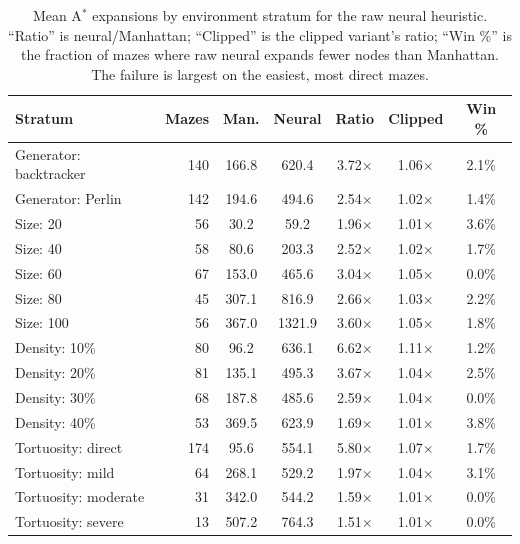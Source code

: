 \begin{table}[H]
\centering
\small
\begin{tabular}{lrccccc}
\toprule
\textbf{Stratum} & \textbf{Mazes} & \textbf{Man.} & \textbf{Neural} & \textbf{Ratio} & \textbf{Clipped} & \textbf{Win \%} \\
\midrule
Generator: backtracker & 140 & 166.8 & 620.4 & 3.72$\times$ & 1.06$\times$ & 2.1\% \\
Generator: Perlin & 142 & 194.6 & 494.6 & 2.54$\times$ & 1.02$\times$ & 1.4\% \\
Size: 20 & 56 & 30.2 & 59.2 & 1.96$\times$ & 1.01$\times$ & 3.6\% \\
Size: 40 & 58 & 80.6 & 203.3 & 2.52$\times$ & 1.02$\times$ & 1.7\% \\
Size: 60 & 67 & 153.0 & 465.6 & 3.04$\times$ & 1.05$\times$ & 0.0\% \\
Size: 80 & 45 & 307.1 & 816.9 & 2.66$\times$ & 1.03$\times$ & 2.2\% \\
Size: 100 & 56 & 367.0 & 1321.9 & 3.60$\times$ & 1.05$\times$ & 1.8\% \\
Density: 10\% & 80 & 96.2 & 636.1 & 6.62$\times$ & 1.11$\times$ & 1.2\% \\
Density: 20\% & 81 & 135.1 & 495.3 & 3.67$\times$ & 1.04$\times$ & 2.5\% \\
Density: 30\% & 68 & 187.8 & 485.6 & 2.59$\times$ & 1.04$\times$ & 0.0\% \\
Density: 40\% & 53 & 369.5 & 623.9 & 1.69$\times$ & 1.01$\times$ & 3.8\% \\
Tortuosity: direct & 174 & 95.6 & 554.1 & 5.80$\times$ & 1.07$\times$ & 1.7\% \\
Tortuosity: mild & 64 & 268.1 & 529.2 & 1.97$\times$ & 1.04$\times$ & 3.1\% \\
Tortuosity: moderate & 31 & 342.0 & 544.2 & 1.59$\times$ & 1.01$\times$ & 0.0\% \\
Tortuosity: severe & 13 & 507.2 & 764.3 & 1.51$\times$ & 1.01$\times$ & 0.0\% \\
\bottomrule
\end{tabular}
\caption{Mean A$^\ast$ expansions by environment stratum for the raw neural
heuristic. ``Ratio'' is neural/Manhattan; ``Clipped'' is the clipped variant's
ratio; ``Win \%'' is the fraction of mazes where raw neural expands fewer nodes
than Manhattan. The failure is largest on the easiest, most direct mazes.}
\label{tab:phase5_strata}
\end{table}
